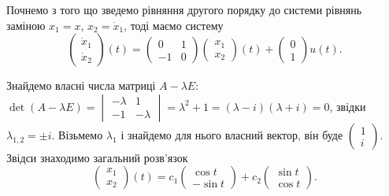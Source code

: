 \begin{solution}
    Почнемо з того що зведемо рівняння другого порядку до системи рівнянь заміною $x_1 = x$, $x_2 = \dot x_1$, тоді маємо систему
    \[ \begin{pmatrix} \dot x_1 \\ \dot x_2 \end{pmatrix} (t) = \begin{pmatrix} 0 & 1 \\ -1 & 0 \end{pmatrix} \begin{pmatrix} x_1 \\ x_2 \end{pmatrix} (t) + \begin{pmatrix} 0 \\ 1 \end{pmatrix} u(t). \]
    
    Знайдемо власні числа матриці $A - \lambda E$: $\det(A - \lambda E) = \begin{vmatrix} -\lambda & 1 \\ -1 & -\lambda \end{vmatrix} = \lambda^2 + 1 = (\lambda - i) (\lambda + i) = 0$, звідки $\lambda_{1, 2} = \pm i$. Візьмемо $\lambda_1$ і знайдемо для нього власний вектор, він буде $\begin{pmatrix} 1 \\ i \end{pmatrix}$. Звідси знаходимо загальний розв'язок
    \[ \begin{pmatrix} x_1 \\ x_2 \end{pmatrix} (t) = c_1 \begin{pmatrix} \cos t \\ - \sin t \end{pmatrix} + c_2 \begin{pmatrix} \sin t \\ \cos t \end{pmatrix}. \]
    

\end{solution}
